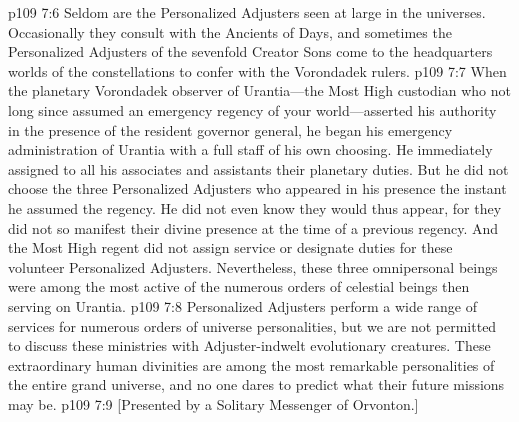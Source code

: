 \vs p109 7:6 Seldom are the Personalized Adjusters seen at large in the universes. Occasionally they consult with the Ancients of Days, and sometimes the Personalized Adjusters of the sevenfold Creator Sons come to the headquarters worlds of the constellations to confer with the Vorondadek rulers.
\pc \vs p109 7:7 When the planetary Vorondadek observer of Urantia---the Most High custodian who not long since assumed an emergency regency of your world---asserted his authority in the presence of the resident governor general, he began his emergency administration of Urantia with a full staff of his own choosing. He immediately assigned to all his associates and assistants their planetary duties. But he did not choose the three Personalized Adjusters who appeared in his presence the instant he assumed the regency. He did not even know they would thus appear, for they did not so manifest their divine presence at the time of a previous regency. And the Most High regent did not assign service or designate duties for these volunteer Personalized Adjusters. Nevertheless, these three omnipersonal beings were among the most active of the numerous orders of celestial beings then serving on Urantia.
\pc \vs p109 7:8 Personalized Adjusters perform a wide range of services for numerous orders of universe personalities, but we are not permitted to discuss these ministries with Adjuster\hyp{}indwelt evolutionary creatures. These extraordinary human divinities are among the most remarkable personalities of the entire grand universe, and no one dares to predict what their future missions may be.
\vsetoff
\vs p109 7:9 [Presented by a Solitary Messenger of Orvonton.]

